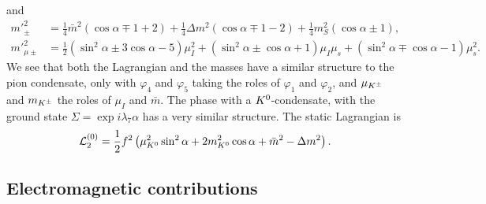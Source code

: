 %
and
%
\begingroup
\allowdisplaybreaks
\begin{align}
    {m'}_\pm^2
    & =
    \frac{1}{4}\bar m^2 (\cos\alpha \mp 1 + 2)
    + \frac{1}{4} \Delta m^2 (\cos\alpha \mp 1-2)
    +\frac{1}{4} m_S^2 (\cos\alpha \pm 1), \\
    {m'}_{\mu\pm}^2
    & =
    \frac{1}{2}(\sin^2\alpha  \pm 3\cos\alpha - 5)\mu_I^2
    +(\sin^2\alpha\pm\cos\alpha + 1)\mu_I\mu_s
    +(\sin^2\alpha\mp\cos\alpha - 1)\mu_s^2.
\end{align}
\endgroup
%
We see that both the Lagrangian and the masses have a similar structure to the pion condensate, only with $\varphi_4$ and $\varphi_5$ taking the roles of $\varphi_1$ and $\varphi_2$, and $\mu_{K^\pm}$ and $m_{K^\pm}$ the roles of $\mu_I$ and $\bar m$.
The phase with a ${K^0}$-condensate, with the ground state $\Sigma = \exp{i \lambda_7 \alpha}$ has a very similar structure.
The static Lagrangian is
%
\begin{equation}
    \label{static Lagrangian neutral kaon}
    \mathcal{L}_2^{(0)} = \frac{1}{2}f^2 
    \left(
        \mu_{K^0}^2 \sin^2\alpha
        + 2m_{K^0}^2\cos\alpha + \bar m^2 - \Delta m^2
    \right).
\end{equation}
%


 
\subsection{Electromagnetic contributions}

